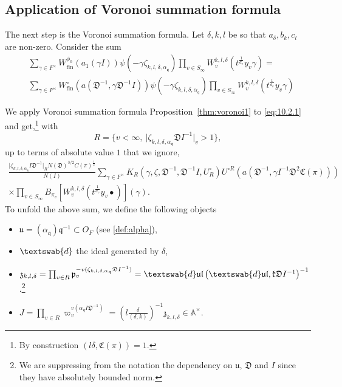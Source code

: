 \documentclass[a4paper,11pt]{amsart}
\theoremstyle{definition}
\newcommand{\A}{\mathbb{A}}
\newcommand{\fin}{\text{fin}}
\begin{document}
\subsection{Application of Voronoi summation formula}

The next step is the Voronoi summation formula. Let $\delta,k,l$ be so that $a_{\delta},b_k,c_l$ are non-zero. Consider the sum
\begin{align}\label{eq:10.2.1}
    &\sum_{\gamma \in F^{\times}}W^{\phi_0}_{\fin}(a_1(\gamma I))\psi(-\gamma \zeta_{k,l,\delta,\alpha_{\mathfrak{q}}})\prod_{v \in S_{\infty}}W^{k,l,\delta}_{v}(t^{\frac{1}{d_v}}y_v\gamma) = \nonumber\\
    &\sum_{\gamma \in F^{\times}}W^{\circ}_{\fin}\left(a(\mathfrak{D}^{-1},\gamma \mathfrak{D}^{-1}I)\right)\psi(-\gamma \zeta_{k,l,\delta,\alpha_{\mathfrak{q}}})\prod_{v \in S_{\infty}}W^{k,l,\delta}_{v}(t^{\frac{1}{d_v}}y_v\gamma)
\end{align}


We apply Voronoi summation formula Proposition~\ref{thm:voronoi1} to \eqref{eq:10.2.1} and get,\footnote{By construction $(l\delta,\mathfrak{C}(\pi))=1$.}  with $$R=\{v<\infty,\ \vert{\zeta_{k,l,\delta,\alpha_{\mathfrak{q}}} \mathfrak{D} I^{-1}}\vert_v>1\},$$ up to terms of absolute value $1$ that we ignore,
\begin{align}\label{eq:10.2.2}
   \frac{\vert{\zeta_{k,l,\delta,\alpha_\mathfrak{q}} I\mathfrak{D}^{-1}}\vert_{R}N(\mathfrak{D})^{3/2}C(\pi)^{\frac{1}{2}}}{N(I)}\sum_{\gamma \in F^{\times}}K_{R}(\gamma,\zeta, \mathfrak{D}^{-1},\mathfrak{D}^{-1}I, U^{\circ}_R)U^{\circ R}(a(\mathfrak{D}^{-1},\gamma I^{-1}\mathfrak{D}^2\mathfrak{C}(\pi))) \nonumber\\
   \times\prod_{v\in S_{\infty}}B_{\pi_v}[W^{k,l,\delta}_v(t^{\frac{1}{d_v}}y_v\bullet)](\gamma). \end{align}To unfold the above sum, we define the following objects \begin{itemize}
       \item  $\mathfrak{u} = (\alpha_{\mathfrak{q}})\mathfrak{q}^{-1}\subset O_F$ (see \eqref{def:alpha}),
       \item  $\textswab{d}$ the ideal generated by $\delta$,
       \item $\mathfrak{z}_{k,l,\delta}=\prod_{v\in R}\mathfrak{p}_v^{-v(\zeta_{k,l,\delta,\alpha_{\mathfrak{q}}}\mathfrak{D}I^{-1})}=\textswab{d}\mathfrak{ul}\left(\textswab{d}\mathfrak{ul},\mathfrak{kD}I^{-1}\right)^{-1}$.\footnote{We are suppressing from the notation the dependency on $\mathfrak{u}$, $\mathfrak{D}$ and $I$ since they have absolutely bounded norm.}
       \item $J=\prod_{v\in R}\varpi_v^{v(\alpha_{\mathfrak{q}}I\mathfrak{D}^{-1})} = (l\frac{\delta}{(\delta,k)})^{-1}\mathfrak{z}_{k,l,\delta} \in \A^{\times}$.
   \end{itemize}   
   
\end{document}
